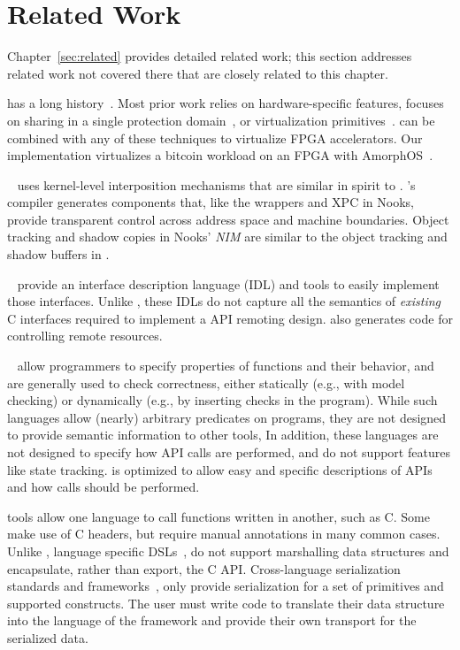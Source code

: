 \section{Related Work}
\label{s:related}

Chapter~\ref{sec:related} provides detailed related work; this section
addresses related work not covered there that are closely related to this
chapter.

 has a long history~\cite{codezero,
plessl2005zippy, score,tartan06asplos,virtualRC,huang09fpgavirt,brant2012zuma,
rcmw, intermediate-fabrics}. Most prior work relies on hardware-specific
features, focuses on sharing in a single protection domain~\cite{amorphos}, or
virtualization primitives~\cite{cascade}. \hira can be combined with any of
these techniques to virtualize FPGA accelerators. Our implementation
virtualizes a bitcoin workload on an FPGA with AmorphOS~\cite{amorphos}.

~\cite{nooks} uses kernel-level interposition mechanisms
that are similar in spirit to \AvA. \AvA's compiler generates components that,
like the wrappers and XPC in Nooks, provide transparent control across address
space and machine boundaries. Object tracking and shadow copies in Nooks'
\emph{NIM} are similar to the object tracking and shadow buffers in \AvA.

~\cite{grpc,thrift,corba,Yang1996} provide an
interface description language (IDL) and tools to easily implement those
interfaces. Unlike \lapis, these IDLs do not capture all the semantics of
\emph{existing} C interfaces required to implement a \hira API remoting design.
\CAvA also generates code for controlling remote resources.

~\cite{mssal} allow programmers
to specify properties of functions and their behavior, and are generally used
to check correctness, either statically (e.g., with model checking) or
dynamically (e.g., by inserting checks in the program). While such languages
allow (nearly) arbitrary predicates on programs, they are not designed to
provide semantic information to other tools, In addition, these languages are
not designed to specify how API calls are performed, and do not support
features like state tracking. \Lapis is optimized to allow easy and
specific descriptions of APIs and how calls should be performed.

 tools allow one language to call
functions written in another, such as C. Some~\cite{swig} make use of C
headers, but require manual annotations in many common cases. Unlike \AvA,
language specific DSLs~\cite{cython,jna}, do not support marshalling data
structures and encapsulate, rather than export, the C API. Cross-language
serialization standards and frameworks~\cite{protobuf, msgpack, ecma404}, only
provide serialization for a set of primitives and supported constructs. The
user must write code to translate their data structure into the language of
the framework and provide their own transport for the serialized data.